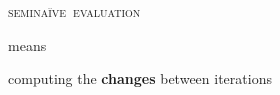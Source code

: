 \documentclass[aspectratio=169,dvipsnames,draft]{beamer}
\providecommand\strong[1]{{\bfseries#1}}
\newcommand\x\times
\newcommand\D\Delta
\newcommand\fn{\ensuremath{\lambda}}
\newcommand\iso{{\texorpdfstring{\ensuremath{\square}}{box}}}
\newcommand\tpname\text
\newcommand\tset{\tpname{set}~}
\newcommand\tunit{\ensuremath{1}}
\newcommand\naive{na\"ive}
\let\oldcup\cup
\renewcommand\cup{\mathrel{\oldcup}}
\begin{document}

  \begin{frame}{}{}\huge\centering
    \setlength\parskip{2ex}

    {\scshape semi\naive\ evaluation}

    means

    {computing the {\strong{changes}} between iterations}

  \end{frame}






\end{document}
